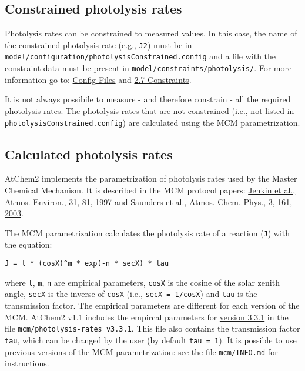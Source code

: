 \subsection{Constrained photolysis
  rates} \label{subsec:constrained-photolysis-rates}

Photolysis rates can be constrained to measured values. In this case,
the name of the constrained photolysis rate (e.g., \texttt{J2}) must
be in \texttt{model/configuration/photolysisConstrained.config} and a
file with the constraint data must be present in
\texttt{model/constraints/photolysis/}. For more information go to:
\hyperref[sec:config]{Config Files} and \hyperref[sec:constraints]{2.7
  Constraints}.

It is not always possibile to measure - and therefore constrain - all
the required photolysis rates. The photolysis rates that are not
constrained (i.e., not listed in
\texttt{photolysisConstrained.config}) are calculated using the MCM
parametrization.

\subsection{Calculated photolysis
  rates} \label{subsec:calculated-photolysis-rates}

AtChem2 implements the parametrization of photolysis rates used by the
Master Chemical Mechanism. It is described in the MCM protocol papers:
\href{https://doi.org/10.1016/S1352-2310(96)00105-7}{Jenkin et al.,
  Atmos. Environ., 31, 81, 1997} and
\href{https://doi.org/10.5194/acp-3-161-2003}{Saunders et al., Atmos.
  Chem. Phys., 3, 161, 2003}.

The MCM parametrization calculates the photolysis rate of a reaction
(\texttt{J}) with the equation:

\begin{verbatim}
J = l * (cosX)^m * exp(-n * secX) * tau
\end{verbatim}

where \texttt{l}, \texttt{m}, \texttt{n} are empirical parameters,
\texttt{cosX} is the cosine of the solar zenith angle, \texttt{secX}
is the inverse of \texttt{cosX} (i.e., \texttt{secX\ =\ 1/cosX}) and
\texttt{tau} is the transmission factor. The empirical parameters are
different for each version of the MCM. AtChem2 v1.1 includes the
empircal parameters for
\href{http://mcm.leeds.ac.uk/MCM/parameters/photolysis_param.htt}{version
  3.3.1} in the file \texttt{mcm/photolysis-rates\_v3.3.1}. This file
also contains the transmission factor \texttt{tau}, which can be
changed by the user (by default \texttt{tau\ =\ 1}). It is possible to
use previous versions of the MCM parametrization: see the file
\texttt{mcm/INFO.md} for instructions.


